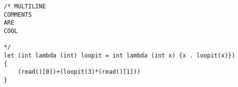 \documentclass[a4paper]{article}
\begin{document}
\renewcommand{\theFancyVerbLine}{
  \sffamily\textcolor[rgb]{0.5,0.5,0.5}{\scriptsize\arabic{FancyVerbLine}}}

\begin{verbatim}
    /* MULTILINE
    COMMENTS
    ARE
    COOL 

    */
    let (int lambda (int) loopit = int lambda (int x) {x . loopit(x)})
    {
        (read()[0])+(loopit(3)*(read()[1]))
    }
\end{verbatim}
\end{document}
